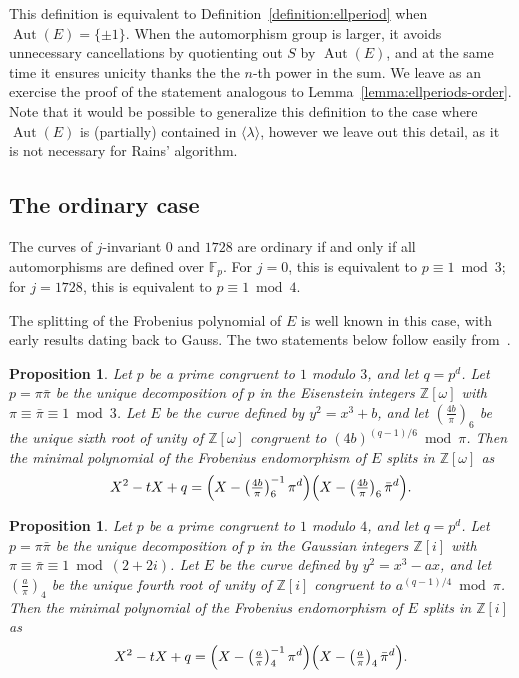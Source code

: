 \documentclass[12pt]{article}
\theoremstyle{plain}
\newtheorem{proposition}[theorem]{Proposition}
\theoremstyle{definition}
\DeclareMathOperator{\Aut}{Aut}
\def\Z{\ensuremath{\mathbb{Z}}}
\def\F{\ensuremath{\mathbb{F}}}
\newcounter{algorithm}
\begin{document}
This definition is equivalent to Definition~\ref{definition:ellperiod}
when $\Aut(E)=\{\pm1\}$. %
When the automorphism group is larger, it avoids unnecessary
cancellations by quotienting out $S$ by $\Aut(E)$, and at the same
time it ensures unicity thanks the the $n$-th power in the sum. %
We leave as an exercise the proof of the statement analogous to
Lemma~\ref{lemma:ellperiods-order}. %
Note that it would be possible to generalize this definition to the
case where $\Aut(E)$ is (partially) contained in
$\langle{\lambda}\rangle$, however we leave out this detail, as it is
not necessary for Rains' algorithm.


\subsection{The ordinary case}

The curves of $j$-invariant $0$ and $1728$ are ordinary if and only if
all automorphisms are defined over $\F_p$. %
For $j=0$, this is equivalent to $p\equiv 1 \bmod 3$; for $j=1728$,
this is equivalent to $p\equiv 1 \bmod 4$. %

The splitting of the Frobenius polynomial of $E$ is well known in this
case, with early results dating back to Gauss. %
The two statements below follow easily
from~\cite[Th.~2.5,2.6]{silverberg2010group}.

\begin{proposition}
  Let $p$ be a prime congruent to $1$ modulo $3$, and let $q=p^d$. %
  Let $p=\pi\bar\pi$ be the unique decomposition of $p$ in the
  Eisenstein integers $\Z[\omega]$ with
  $\pi\equiv\bar\pi\equiv1\bmod3$. %
  Let $E$ be the curve defined by $y^2=x^3+b$, and let
  $\left(\tfrac{4b}{\pi}\right)_6$ be the unique sixth root of unity
  of $\Z[\omega]$ congruent to $(4b)^{(q-1)/6}\bmod \pi$. %
  Then the minimal polynomial of the Frobenius endomorphism of $E$
  splits in $\Z[\omega]$ as
  \begin{equation*}
    X^2 - tX + q =
    \Bigl(X - \left(\tfrac{4b}{\pi}\right)_6^{-1}\pi^d\Bigr)
    \Bigl(X - \left(\tfrac{4b}{\pi}\right)_6\bar\pi^d\Bigr).
  \end{equation*}
\end{proposition}

\begin{proposition}
  Let $p$ be a prime congruent to $1$ modulo $4$, and let $q=p^d$. %
  Let $p=\pi\bar\pi$ be the unique decomposition of $p$ in the
  Gaussian integers $\Z[i]$ with
  $\pi\equiv\bar\pi\equiv 1 \bmod (2+2i)$. %
  Let $E$ be the curve defined by $y^2=x^3-ax$, and let
  $\left(\tfrac{a}{\pi}\right)_4$ be the unique fourth root of unity
  of $\Z[i]$ congruent to $a^{(q-1)/4}\bmod \pi$. %
  Then the minimal polynomial of the Frobenius endomorphism of $E$
  splits in $\Z[i]$ as
  \begin{equation*}
    X^2 - tX + q =
    \Bigl(X - \left(\tfrac{a}{\pi}\right)_4^{-1}\pi^d\Bigr)
    \Bigl(X -  \left(\tfrac{a}{\pi}\right)_4\bar\pi^d\Bigr).
  \end{equation*}
\end{proposition}
\end{document}
